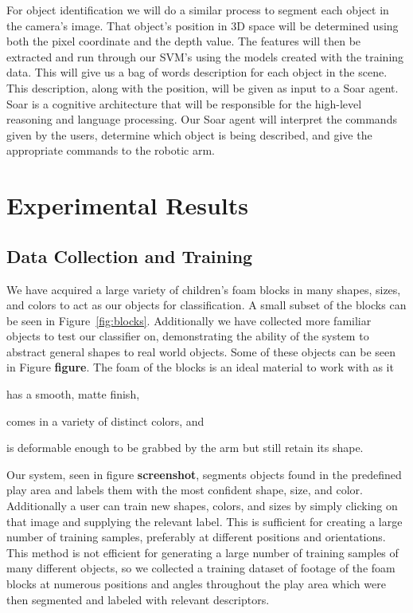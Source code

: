 \documentclass[11pt]{article}
\newcommand{\meh}[1]{{\bf \color{blue} #1}}
\begin{document}
For object identification we will do a similar process to segment each object in
the camera's image. That object's position in 3D space will be determined using
both the pixel coordinate and the depth value. The features will then be
extracted and run through our SVM's using the models created with the training
data. This will give us a bag of words description for each object in the scene.
This description, along with the position, will be given as input to a Soar
agent. Soar is a cognitive architecture that will be responsible for the
high-level reasoning and language processing. Our Soar agent will interpret the
commands given by the users, determine which object is being described, and give
the appropriate commands to the robotic arm.


\section{Experimental Results}

\subsection{Data Collection and Training}
We have acquired a large variety of children's foam blocks in many shapes, sizes,
and colors to act as our objects for classification. A small subset of the
blocks can be seen in Figure~\ref{fig:blocks}. Additionally we have collected 
more familiar objects to test our classifier on, demonstrating the ability of 
the system to abstract general shapes to real world objects. Some of these 
objects can be seen in Figure \meh{figure}. The foam of the blocks is an
ideal material to work with as it
\begin{inparaenum}[(1)]
\item has a smooth, matte finish,
\item comes in a variety of distinct colors, and
\item is deformable enough to be grabbed by the arm but still retain its
shape.
\end{inparaenum}


Our system, seen in figure \meh{screenshot}, segments objects found in the 
predefined play area and labels them with the most confident shape, size, and 
color.  Additionally a user can train new shapes, colors, and sizes by simply 
clicking on that image and supplying the relevant label.  This is sufficient 
for creating a large number of training samples, preferably at different 
positions and orientations.  This method is not efficient for generating a 
large number of training samples of many different objects, so we collected a 
training dataset of footage of the foam blocks at numerous positions and angles throughout the play area which were then segmented and labeled with relevant 
descriptors.
\end{document}
